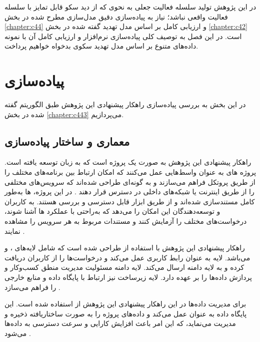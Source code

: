 
در این پژوهش تولید سلسله فعالیت جعلی به نحوی که از دید سکو قابل تمایز با سلسله فعالیت واقعی نباشد؛ نیاز به پیاده‌سازی دقیق مدل‌سازی مطرح شده در بخش \ref{chapter:c44} و ارزیابی کامل بر اساس مدل تهدید گفته شده در بخش \ref{chapter:c42} است. در این فصل به توصیف کلی پیاده‌سازی نرم‌افزار و ارزیابی کامل آن با نمونه داده‌های متنوع بر اساس مدل تهدید سکوی بدخواه خواهیم پرداخت.

\section{پیاده‌سازی}

در این بخش به بررسی پیاده‌سازی راهکار پیشنهادی این پژوهش طبق الگوریتم گفته شده در بخش \ref{chapter:c443} می‌پردازیم.

\subsection{معماری و ساختار پیاده‌سازی}

راهکار پیشنهادی این پژوهش به صورت یک پروژه  است که به زبان  توسعه یافته است. پروژه های  به عنوان واسط‌هایی عمل می‌کنند که امکان ارتباط بین برنامه‌های مختلف را از طریق پروتکل  فراهم می‌سازند و به گونه‌ای طراحی شده‌اند که سرویس‌های مختلفی را از طریق اینترنت یا شبکه‌های داخلی در دسترس قرار دهند \cite{xp1}. در این پروژه، ها به‌طور کامل مستندسازی شده‌اند و از طریق ابزار  قابل دسترسی و بررسی هستند.  به کاربران و توسعه‌دهندگان این امکان را می‌دهد که به‌راحتی با عملکرد ها آشنا شوند، درخواست‌های مختلف را آزمایش کنند و مستندات مربوط به هر سرویس را مشاهده نمایند \cite{xp2}.

راهکار پیشنهادی این پژوهش با استفاده از  طراحی شده است که شامل لایه‌های ،  و  می‌باشد. لایه  به عنوان رابط کاربری عمل می‌کند و درخواست‌ها را از کاربران دریافت کرده و به لایه دامنه ارسال می‌کند. لایه دامنه مسئولیت مدیریت منطق کسب‌وکار و پردازش داده‌ها را بر عهده دارد. لایه زیرساخت نیز ارتباط با پایگاه داده و منابع خارجی را فراهم می‌سازد \cite{xp3}.

برای مدیریت داده‌ها در این راهکار پیشنهادی این پژوهش از  استفاده شده است. این پایگاه داده به عنوان  عمل می‌کند و داده‌های پروژه را به صورت ساختاریافته ذخیره و مدیریت می‌نماید، که این امر باعث افزایش کارایی و سرعت دسترسی به داده‌ها می‌شود \cite{xp4}.

